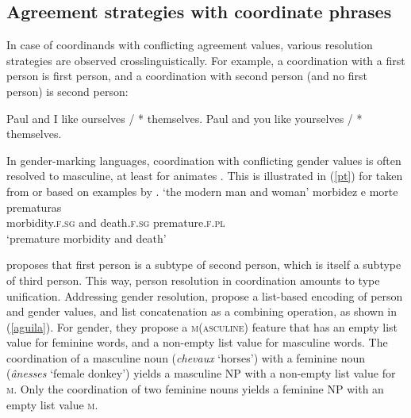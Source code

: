 \subsection{Agreement strategies with coordinate phrases}
\label{coordination:sec-agreement-with-coordinate-phrases}

In case of coordinands with conflicting agreement values, various resolution strategies are observed 
crosslinguistically. For example, a coordination with a first person is first person, and a coordination with second person (and no first person) is second person:

\eal
\ex Paul and I like ourselves / * themselves.
\ex Paul and you like yourselves / * themselves.
\zl

\largerpage
In gender-marking languages, coordination with conflicting gender values is often resolved to
masculine, at least for animates \citep[186]{Corbet91}. This is illustrated in (\ref{pt}) for
 taken from or based on examples by \citet*{Villavicencio:Sadler:ea:05}. 
\eal
\label{pt}
\ex 
{}
\glt `the modern man and woman'
\ex 
\gll morbidez e morte prematuras\footnotemark\\
     morbidity.\textsc{f.sg} and death.\textsc{f.sg} premature.\textsc{f.pl}\\
\glt `premature morbidity and death'\\
\zl


\citet[]{Sag:03} proposes that first person is a subtype of second person, which is itself a subtype of third person. This way, person resolution in coordination amounts to type unification. Addressing gender resolution, \citet{Aguila:Crysmann:18} propose a list-based encoding of person and gender values, and list concatenation as a combining operation, as shown in (\ref{aguila}). For gender, they propose a \textsc{m}(\textsc{asculine}) feature that has an empty list value for feminine words, and a non-empty list value for masculine words.  The coordination of a masculine noun (\emph{chevaux} `horses') with a feminine noun (\emph{\^{a}nesses} `female donkey')  yields a masculine NP with a non-empty list value for \textsc{m}. Only the coordination of two feminine nouns yields a feminine NP with an empty list value \textsc{m}.
 
